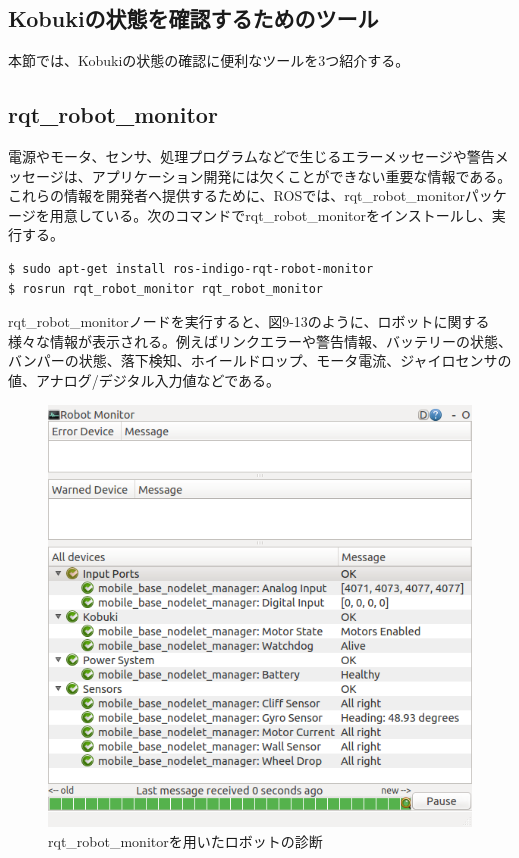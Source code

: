 \begin{itemize}
\section{Kobukiの状態を確認するためのツール}

本節では、Kobukiの状態の確認に便利なツールを3つ紹介する。

\subsection{rqt\_robot\_monitor}

電源やモータ、センサ、処理プログラムなどで生じるエラーメッセージや警告メッセージは、アプリケーション開発には欠くことができない重要な情報である。これらの情報を開発者へ提供するために、ROSでは、rqt\_robot\_monitorパッケージを用意している。次のコマンドでrqt\_robot\_monitorをインストールし、実行する。

\begin{lstlisting}[language=ROS]
$ sudo apt-get install ros-indigo-rqt-robot-monitor
$ rosrun rqt_robot_monitor rqt_robot_monitor
\end{lstlisting}

rqt\_robot\_monitorノードを実行すると、図9-13のように、ロボットに関する様々な情報が表示される。例えばリンクエラーや警告情報、バッテリーの状態、バンパーの状態、落下検知、ホイールドロップ、モータ電流、ジャイロセンサの値、アナログ/デジタル入力値などである。

\begin{figure}[ht]
  \centering
  \includegraphics[width=\columnwidth]{pictures/chapter9/pic_09_13.png}
  \caption{rqt\_robot\_monitorを用いたロボットの診断}
\end{figure}


\end{itemize}
